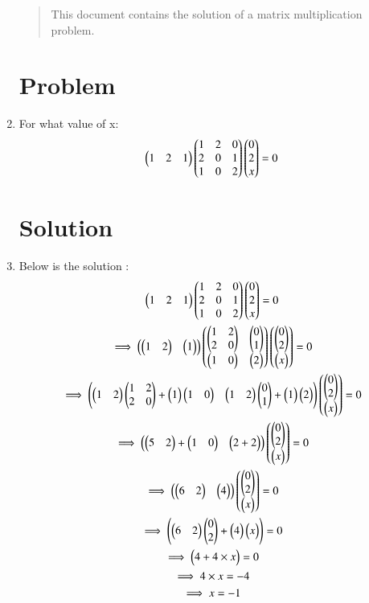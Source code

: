 \begin{enumerate}[label=\thesection.\arabic*.,ref=\thesection.\theenumi]

\begin{abstract}
    This document contains the solution of a matrix multiplication problem.
\end{abstract}

\section{Problem}
\item For what value of x:
\begin{align}
    \myvec{1 & 2 & 1}\myvec{1 & 2 & 0 \\2 & 0 & 1\\1 & 0 & 2}\myvec{0 \\ 2 \\ x}=0
\end{align}

\section{Solution}
\item Below is the solution :
\begin{multline}
    \myvec{1 & 2 & 1}\myvec{1 & 2 & 0 \\2 & 0 & 1\\1 & 0 & 2}\myvec{0 \\ 2 \\ x}=0
\\
    \implies \myvec{\myvec{1&2}&\myvec{1}}\myvec{\myvec{1&2\\2&0}&\myvec{0\\1}\\\myvec{1&0}&\myvec{2}}\myvec{\myvec{0\\2}\\\myvec{x}}=0
\\
    \implies \myvec{\myvec{1&2}\myvec{1&2\\2&0}+\myvec{1}\myvec{1&0}&\myvec{1&2}\myvec{0\\1}+\myvec{1}\myvec{2}}\myvec{\myvec{0\\2}\\\myvec{x}}=0
\\
    \implies\myvec{\myvec{5&2}+\myvec{1&0}&\myvec{2+2}}\myvec{\myvec{0\\2}\\\myvec{x}}=0
\\
    \implies \myvec{\myvec{6&2}&\myvec{4}}\myvec{\myvec{0\\2}\\\myvec{x}}=0
\\
    \implies \myvec{\myvec{6&2}\myvec{0\\2}+\myvec{4}\myvec{x}}=0
\\
    \implies \myvec{4+4\times x}=0
\\
    \implies 4\times x=-4
\\
    \implies x=-1
\end{multline}

\end{enumerate}


